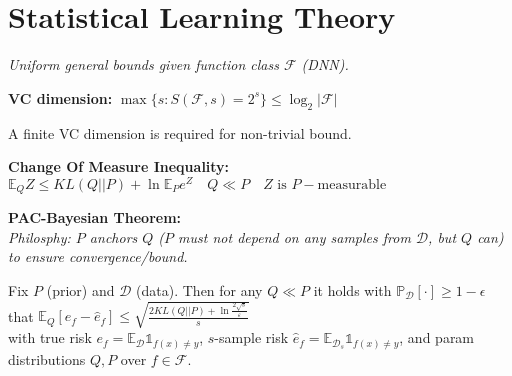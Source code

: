 \color{black}
\section*{Statistical Learning Theory}
\textit{Uniform general bounds given function class \(\mathcal F\) (DNN).}

\textbf{VC dimension:} $\max \{s : S(\mathcal{F}, s) = 2^s\} \leq \log_2 |\mathcal{F}|$

A finite VC dimension is required for non-trivial bound.

\textbf{Change Of Measure Inequality:}\\
$\mathbb E_Q Z \leq KL(Q||P) + \ln \mathbb E_P e^Z \quad Q \ll P \quad Z \text{ is }P-\text{measurable}$

\textbf{PAC-Bayesian Theorem:}\\
\textit{Philosphy: $P$ anchors $Q$ ($P$ must not depend on any samples from $\mathcal{D}$, but $Q$ can) to ensure convergence/bound.}

Fix $P$ (prior) and $\mathcal{D}$ (data). Then for any $Q \ll P$ it holds with $\mathbb P_\mathcal{D}[\cdot] \geq 1-\epsilon$ that $\mathbb{E}_Q[ e_f - \hat e_f] \leq \sqrt{\frac{2KL(Q||P) + \ln \frac{2\sqrt{s}}{\varepsilon}}{s}}$\\
with true risk $e_f = \mathbb{E}_\mathcal{D} \mathds{1}_{f(x) \not = y}$, $s$-sample risk $\hat{e}_f = \mathbb{E}_{\mathcal{D}_s} \mathds{1}_{f(x) \not = y}$, and param distributions $Q, P$ over $f \in \mathcal F$.